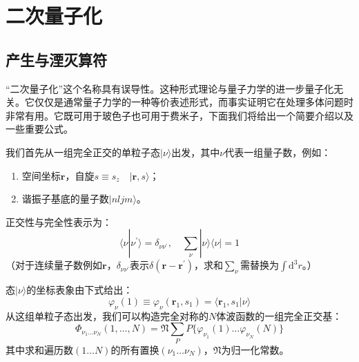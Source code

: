 
\chapter{二次量子化\label{chap:=004E8C=006B21=0091CF=005B50=005316}}

\section{产生与湮灭算符}

“二次量子化”这个名称具有误导性。这种形式理论与量子力学的进一步量子化无关。它仅仅是通常量子力学的一种等价表述形式，而事实证明它在处理多体问题时非常有用。它既可用于玻色子也可用于费米子，下面我们将给出一个简要介绍以及一些重要公式。

我们首先从一组完全正交的单粒子态$|\nu\rangle$出发，其中$\nu$代表一组量子数，例如：
\begin{enumerate}
\item 空间坐标$\boldsymbol{r}$，自旋$s\equiv s_{z}\quad|\boldsymbol{r},s\rangle$；
\item 谐振子基底的量子数$|nljm\rangle$。
\end{enumerate}
正交性与完全性表示为：
\begin{equation}
\langle\nu|\nu^{\prime}\rangle=\delta_{\nu\nu^{\prime}},\quad\sum_{\nu}|\nu\rangle\langle\nu|=1\label{eq:appendix_c_orthogonality_completeness}
\end{equation}
（对于连续量子数例如$\boldsymbol{r}$，$\delta_{\nu\nu^{\prime}}$表示$\delta(\boldsymbol{r}-\boldsymbol{r}^{\prime})$，求和$\sum_{\nu}$需替换为$\int\mathrm{d}^{3}r$。）

态$|\nu\rangle$的坐标表象由下式给出：
\begin{equation}
\varphi_{\nu}(1)\equiv\varphi_{\nu}(\boldsymbol{r}_{1},s_{1})=\langle\boldsymbol{r}_{1},s_{1}|\nu\rangle\label{eq:appendix_c_coord_rep}
\end{equation}
从这组单粒子态出发，我们可以构造完全对称的$N$体波函数的一组完全正交基：
\begin{equation}
\Phi_{\nu_{1}\dots\nu_{N}}(1,\dots,N)=\mathfrak{N}\sum_{P}P\{\varphi_{\nu_{1}}(1)\dots\varphi_{\nu_{N}}(N)\}\label{eq:appendix_c_boson_basis}
\end{equation}
其中求和遍历数$(1\dots N)$的所有置换$(\nu_{1}\dots\nu_{N})$，$\mathfrak{N}$为归一化常数。

